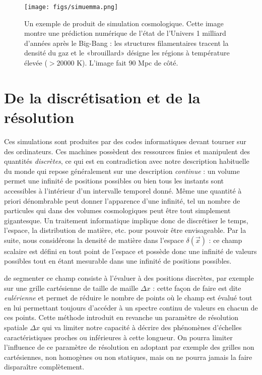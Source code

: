 \begin{figure}[htbp]
	\centering
		\texttt{[image: figs/simuemma.png]}
	\caption[Un exemple de produit de simulation cosmologique]{Un exemple de produit de simulation cosmologique. Cette image montre une prédiction numérique de l'état de l'Univers 1 milliard d'années après le Big-Bang : les structures filamentaires tracent la densité du gaz et le «brouillard» désigne les régions à température élevée ($>20000$ K). L'image fait 90 Mpc de côté.}
	\label{f:simuemma}
\end{figure}

\section{De la discrétisation et de la résolution}
Ces simulations sont produites par des codes informatiques devant tourner sur des ordinateurs. Ces machines possèdent des ressources finies et manipulent des quantités \textit{discrètes}, ce qui est en contradiction avec notre description habituelle du monde qui repose généralement sur une description \textit{continue} : un volume permet une infinité de positions possibles ou bien tous les instants sont accessibles à l'intérieur d'un intervalle temporel donné. Même une quantité à priori dénombrable peut donner l'apparence d'une infinité, tel un nombre de particules qui dans des volumes cosmologiques peut être tout simplement gigantesque. Un traitement informatique implique donc de discrétiser le temps, l'espace, la distribution de matière, etc. pour pouvoir être envisageable.
Par la suite, nous considérons la densité de matière dans l'espace $\delta(\vec x)$ : ce champ scalaire est défini en tout point de l'espace et possède donc une infinité de valeurs possibles tout en étant mesurable dans une infinité de positions possibles. 

 de segmenter ce champ consiste à l'évaluer à des positions discrètes, par exemple sur une grille cartésienne de taille de maille $\Delta x$ : cette façon de faire est dite \textit{eulérienne} et permet de réduire le nombre de points où le champ est évalué tout en lui permettant toujours d'accéder à un spectre continu de valeurs en chacun de ces points. Cette méthode introduit en revanche un paramètre de résolution spatiale $\Delta x$ qui va limiter notre capacité à décrire des phénomènes d'échelles caractéristiques proches ou inférieures à cette longueur. On pourra limiter l'influence de ce paramètre de résolution en adoptant par exemple des grilles non cartésiennes, non homogènes ou non statiques, mais on ne pourra jamais la faire disparaître complètement.

